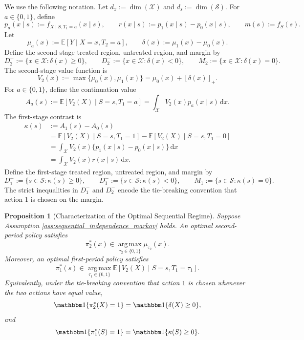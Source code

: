 \documentclass[12pt]{article}
\newtheorem{proposition}[theorem]{Proposition}
\newcommand{\1}{\mathbf{1}}
\begin{document}
We use the following notation. Let $d_x:=\dim(\mathcal X)$ and
$d_s:=\dim(\mathcal S)$. For $a\in\{0,1\}$, define
\[
p_a(x\mid s)
:=
f_{X\mid S,T_1=a}(x\mid s),
\qquad
r(x\mid s)
:=
p_1(x\mid s)-p_0(x\mid s),
\qquad
m(s)
:=
f_S(s).
\]
Let
\[
\mu_a(x):=\mathbb E[Y\mid X=x,T_2=a],
\qquad
\delta(x):=\mu_1(x)-\mu_0(x).
\]
Define the second-stage treated region, untreated region, and margin by
\[
D_2^+ := \{x\in\mathcal X:\delta(x)\geq 0\},
\qquad
D_2^- := \{x\in\mathcal X:\delta(x)<0\},
\qquad
M_2 := \{x\in\mathcal X:\delta(x)=0\}.
\]
The second-stage value function is
\[
V_2(x)
:=
\max\{\mu_0(x),\mu_1(x)\}
=
\mu_0(x)+[\delta(x)]_+.
\]
For $a\in\{0,1\}$, define the continuation value
\[
A_a(s)
:=
\mathbb E[V_2(X)\mid S=s,T_1=a]
=
\int_{\mathcal X}V_2(x)p_a(x\mid s)\,\mathrm dx.
\]
The first-stage contrast is
\begin{align*}
\kappa(s)
&:=
A_1(s)-A_0(s) \\
&=
\mathbb E[V_2(X)\mid S=s,T_1=1]
-
\mathbb E[V_2(X)\mid S=s,T_1=0] \\
&=
\int_{\mathcal X}V_2(x)\{p_1(x\mid s)-p_0(x\mid s)\}\,\mathrm dx \\
&=
\int_{\mathcal X}V_2(x)r(x\mid s)\,\mathrm dx.
\end{align*}
Define the first-stage treated region, untreated region, and margin by
\[
D_1^+ := \{s\in\mathcal S:\kappa(s)\geq 0\},
\qquad
D_1^- := \{s\in\mathcal S:\kappa(s)<0\},
\qquad
M_1 := \{s\in\mathcal S:\kappa(s)=0\}.
\]
The strict inequalities in $D_1^-$ and $D_2^-$ encode the tie-breaking
convention that action $1$ is chosen on the margin.

\begin{proposition}[Characterization of the Optimal Sequential Regime]
\label{prop:characterize_optimal_regime}
Suppose Assumption \ref{ass:sequential_independence_markov} holds. An optimal
second-period policy satisfies
\[
\pi_2^*(x)
\in
\operatorname*{arg\,max}_{\tau_2\in\{0,1\}}
\mu_{\tau_2}(x).
\]
Moreover, an optimal first-period policy satisfies
\[
\pi_1^*(s)
\in
\operatorname*{arg\,max}_{\tau_1\in\{0,1\}}
\mathbb E[V_2(X)\mid S=s,T_1=\tau_1].
\]
Equivalently, under the tie-breaking convention that action $1$ is chosen
whenever the two actions have equal value,
\[
\mathbbm 1\{\pi_2^*(X)=1\}
=
\mathbbm 1\{\delta(X)\geq 0\},
\]
and
\[
\mathbbm 1\{\pi_1^*(S)=1\}
=
\mathbbm 1\{\kappa(S)\geq 0\}.
\]
\end{proposition}
\end{document}
